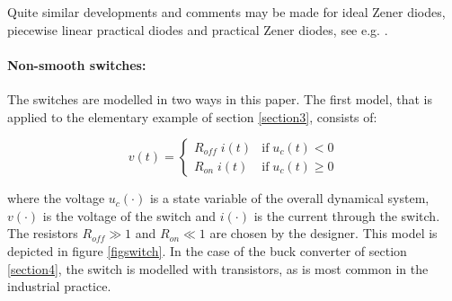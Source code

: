 \documentclass{article}
\def\geq{\geqslant}
\begin{document}
Quite similar developments and comments may be made for ideal Zener diodes, piecewise linear practical diodes and practical Zener diodes, see e.g. \cite{acary-brogliato2008,addi2009}. 


% 


\paragraph{Non-smooth switches:} The switches are modelled in two ways in this paper. The first model, that is applied to the elementary example of section \ref{section3}, consists of:

\begin{equation}\label{switchmodel1}
v(t)=\left\{\begin{array}{ll} R_{off}\; i(t) & \mbox{if}\;u_{c}(t) < 0 \\   R_{on}\; i(t) & \mbox{if}\;u_{c}(t) \geq  0  \end{array}\right.
\end{equation} 

where the voltage $u_{c}(\cdot)$ is a state variable of the overall dynamical system, $v(\cdot)$ is the voltage of the switch and $i(\cdot)$ is the current through the switch. The resistors $R_{off} \gg 1$ and $R_{on} \ll 1$ are chosen by the designer. This model is depicted in figure \ref{figswitch}. In the case of the buck converter of section \ref{section4}, the switch is modelled with transistors, as is most common in the industrial practice. 
\end{document}
